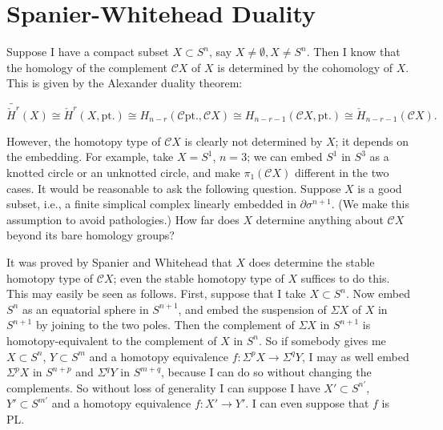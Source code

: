 \documentclass[../main]{subfiles}
\begin{document}

\chapter{Spanier-Whitehead Duality}
\label{sec:p3c5}
Suppose I have a compact subset $X\subset S^n$, say $X\neq\emptyset,X\neq S^n$. Then I know that the homology of the complement $\mathcal{C} X$ of $X$ is determined by the cohomology of $X$. This is given by the Alexander duality theorem:

\begin{equation*}
    \widetilde{\check{H}^r}(X)\cong\check{H}^r(X,\mathrm{pt.})\cong H_{n-r}(\mathcal{C}\mathrm{pt.},\mathcal{C}X)\cong H_{n-r-1}(\mathcal{C}X,\mathrm{pt.})\cong\check{H}_{n-r-1}(\mathcal{C}X).
\end{equation*}

However, the homotopy type of $\mathcal{C}X$ is clearly not determined by $X$; it depends on the embedding. For example, take $X=S^1$, $n=3$; we can embed $S^1$ in $S^3$ as a knotted circle or an unknotted circle, and make $\pi_1(\mathcal{C}X)$ different in the two cases. It would be reasonable to ask the following question. Suppose $X$ is a good subset, i.e., a finite simplical complex linearly embedded in $\partial\sigma^{n+1}$. (We make this assumption to avoid pathologies.) How far does $X$ determine anything about $\mathcal{C}X$ beyond its bare homology groups?

It was proved by Spanier and Whitehead that $X$ does determine the stable homotopy type of $\mathcal{C}X$; even the stable homotopy type of $X$ suffices to do this. This may easily be seen as follows. First, suppose that I take $X\subset S^n$. Now embed $S^n$ as an equatorial sphere in $S^{n+1}$, and embed the suspension of $\Sigma X$ of $X$ in $S^{n+1}$ by joining to the two poles. Then the complement of $\Sigma X$ in $S^{n+1}$ is homotopy-equivalent to the complement of $X$ in $S^n$. So if somebody gives me $X\subset S^n$, $Y\subset S^m$ and a homotopy equivalence $f\colon \Sigma^pX\longrightarrow \Sigma^qY$, I may as well embed $\Sigma^pX$ in $S^{n+p}$ and $\Sigma^qY$ in $S^{m+q}$, because I can do so without changing the complements. So without loss of generality I can suppose I have $X'\subset S^{n'}$, $Y'\subset S^{m'}$ and a homotopy equivalence $f\colon X'\longrightarrow Y'$. I can even suppose that $f$ is PL.
\end{document}
